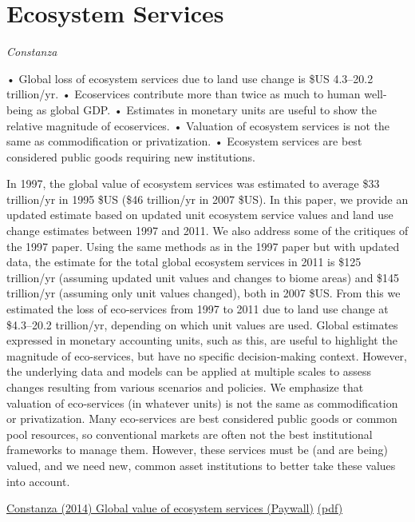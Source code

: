 \documentclass[
]{book}
\begin{document}
\hypertarget{ecosystem-services}{%
\section{Ecosystem Services}\label{ecosystem-services}}

\emph{Constanza}

• Global loss of ecosystem services due to land use change is \$US 4.3--20.2 trillion/yr.
• Ecoservices contribute more than twice as much to human well-being as global GDP.
• Estimates in monetary units are useful to show the relative magnitude of ecoservices.
• Valuation of ecosystem services is not the same as commodification or privatization.
• Ecosystem services are best considered public goods requiring new institutions.

In 1997, the global value of ecosystem services was estimated to average \$33 trillion/yr in 1995 \$US (\$46 trillion/yr in 2007 \$US). In this paper, we provide an updated estimate based on updated unit ecosystem service values and land use change estimates between 1997 and 2011. We also address some of the critiques of the 1997 paper. Using the same methods as in the 1997 paper but with updated data, the estimate for the total global ecosystem services in 2011 is \$125 trillion/yr (assuming updated unit values and changes to biome areas) and \$145 trillion/yr (assuming only unit values changed), both in 2007 \$US. From this we estimated the loss of eco-services from 1997 to 2011 due to land use change at \$4.3--20.2 trillion/yr, depending on which unit values are used. Global estimates expressed in monetary accounting units, such as this, are useful to highlight the magnitude of eco-services, but have no specific decision-making context. However, the underlying data and models can be applied at multiple scales to assess changes resulting from various scenarios and policies. We emphasize that valuation of eco-services (in whatever units) is not the same as commodification or privatization. Many eco-services are best considered public goods or common pool resources, so conventional markets are often not the best institutional frameworks to manage them. However, these services must be (and are being) valued, and we need new, common asset institutions to better take these values into account.

\href{https://doi.org/10.1016/j.gloenvcha.2014.04.002}{Constanza (2014) Global value of ecosystem services (Paywall)}
\href{pdf/Costanza_2014_Global_Ecosystem_Services.pdf}{(pdf)}
\end{document}
